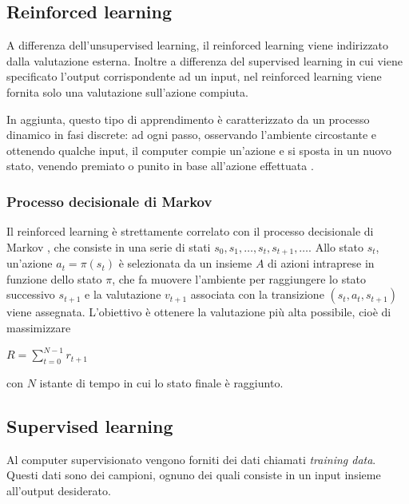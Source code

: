 \documentclass[../main.tex]{subfiles}
\begin{document}
\subsection{Reinforced learning}
A differenza dell'unsupervised learning, il reinforced learning viene indirizzato dalla valutazione esterna. Inoltre a differenza del supervised learning in cui viene specificato l'output corrispondente ad un input, nel reinforced learning viene fornita solo una valutazione sull'azione compiuta.

In aggiunta, questo tipo di apprendimento è caratterizzato da un processo dinamico in fasi discrete: ad ogni passo, osservando l'ambiente circostante e ottenendo qualche input, il computer compie un'azione e si sposta in un nuovo stato, venendo premiato o punito in base all'azione effettuata \cite{compIntelligence}.

\subsubsection{Processo decisionale di Markov}
Il reinforced learning è strettamente correlato con il processo decisionale di Markov \cite{compIntelligence}, che consiste in una serie di stati $s _ { 0 } , s _ { 1 } , \ldots , s _ { t } , s _ { t + 1 } , \ldots$. Allo stato ${ s } _ { t }$, un'azione $a _ { t } = \pi \left( s _ { t } \right)$ è selezionata da un insieme $A$ di azioni intraprese in funzione dello stato $\pi$, che fa muovere l'ambiente per raggiungere lo stato successivo $s _ { t  + 1}$ e la valutazione $v _ {t + 1}$ associata con la transizione $\left( s _ { t } , a _ { t } , s _ { t + 1 } \right)$ viene assegnata. L'obiettivo è ottenere la valutazione più alta possibile, cioè di massimizzare 

\begin{center}
				\begin{math}
								R = \sum _ { t = 0 } ^ { N - 1 } r _ { t + 1 }
				\end{math}
\end{center}

con $N$ istante di tempo in cui lo stato finale è raggiunto.

\subsection{Supervised learning}
Al computer supervisionato vengono forniti dei dati chiamati \textit{training data}. Questi dati sono dei campioni, ognuno dei quali consiste in un input insieme all'output desiderato.
\end{document}
